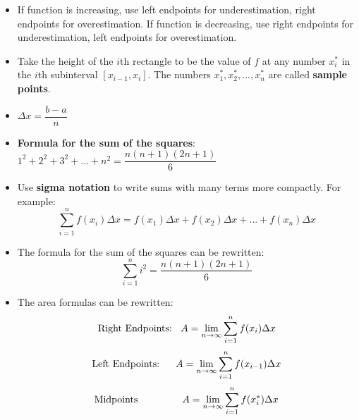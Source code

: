 \documentclass[fleqn]{article}
\begin{document}
\begin{center}
\begin{itemize}
	\item If function is increasing, use left endpoints for underestimation, right endpoints for overestimation. If function is decreasing, use right endpoints for underestimation, left endpoints for overestimation.
	\item Take the height of the $i$th rectangle to be the value of $f$ at any number $x_i^*$ in the $i$th subinterval $[x_{i-1}, x_i]$. The numbers $x_1^*, x_2^*, ... , x_n^*$ are called \textbf{sample points}.
	\item $\Delta x = \dfrac{b-a}{n}$ 
	\item \textbf{Formula for the sum of the squares}: $1^2 + 2^2 +3^2 + ... + n^2 = \dfrac {n(n+1)(2n+1)}{6}$
	\item Use \textbf{sigma notation} to write sums with many terms more compactly. For example:  \[\sum_{i=1}^n f(x_i) \Delta x = f(x_1) \Delta x + f(x_2) \Delta x + ... + f(x_n) \Delta x\]
	\item The formula for the sum of the squares can be rewritten: \[\sum_{i=1}^n i^2 = \dfrac{n(n+1)(2n+1)}{6}\]
	\item The area formulas can be rewritten: 
		\[\text{Right Endpoints: \:\:} A = \underset{n \to \infty}{\lim} \sum_{i=1}^n f(x_i) \Delta x\]
		\[\text{Left Endpoints: \: \hspace{1pt} } A = \underset{n \to \infty}{\lim} \sum_{i=1}^n f(x_{i-1}) \Delta x\]
		\[\text{Midpoints \:\: \hspace{34pt}} A = \underset{n \to \infty}{\lim} \sum_{i=1}^n f(x_i^*) \Delta x\]
\end{itemize}
\end{center}
\pagebreak
\end{document}
